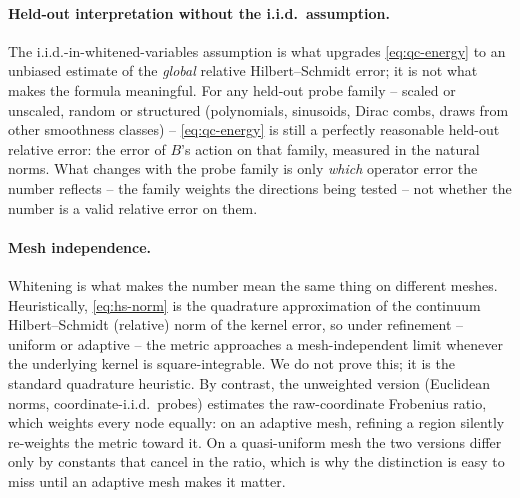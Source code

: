 \documentclass[11pt]{article}
\begin{document}
\paragraph{Held-out interpretation without the i.i.d.\ assumption.} The
i.i.d.-in-whitened-variables assumption is what upgrades \eqref{eq:qc-energy}
to an unbiased estimate of the \emph{global} relative Hilbert--Schmidt error;
it is not what makes the formula meaningful. For any held-out probe family --
scaled or unscaled, random or structured (polynomials, sinusoids, Dirac
combs, draws from other smoothness classes) -- \eqref{eq:qc-energy} is still
a perfectly reasonable held-out relative error: the error of $B$'s action on
that family, measured in the natural norms. What changes with the probe
family is only \emph{which} operator error the number reflects -- the family
weights the directions being tested -- not whether the number is a valid
relative error on them.

\paragraph{Mesh independence.} Whitening is what makes the number mean the same
thing on different meshes. Heuristically, \eqref{eq:hs-norm} is the quadrature
approximation of the continuum Hilbert--Schmidt (relative) norm of the kernel
error, so under refinement -- uniform or adaptive -- the metric approaches a
mesh-independent limit whenever the underlying kernel is square-integrable. We
do not prove this; it is the standard quadrature heuristic. By contrast, the
unweighted version (Euclidean norms, coordinate-i.i.d.\ probes) estimates the
raw-coordinate Frobenius ratio, which weights every node equally: on an
adaptive mesh, refining a region silently re-weights the metric toward it. On
a quasi-uniform mesh the two versions differ only by constants that cancel in
the ratio, which is why the distinction is easy to miss until an adaptive mesh
makes it matter.
\end{document}
